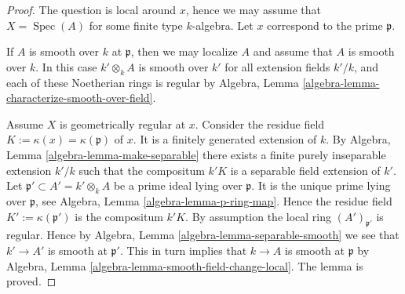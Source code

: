 \documentclass[10pt,a4paper]{amsart}
\theoremstyle{plain}
\theoremstyle{definition}
\theoremstyle{remark}
\numberwithin{equation}{subsection}
\def\Spec{\mathop{\mathrm{Spec}}}
\begin{document}
\begin{proof}
The question is local around $x$,
hence we may assume that $X = \Spec(A)$
for some finite type $k$-algebra.
Let $x$ correspond to the prime $\mathfrak p$.

\medskip\noindent
If $A$ is smooth over $k$ at $\mathfrak p$, then we may localize $A$
and assume that $A$ is smooth over $k$. In this case $k' \otimes_k A$
is smooth over $k'$ for all extension fields $k'/k$, and each of
these Noetherian rings is regular by
Algebra, Lemma \ref{algebra-lemma-characterize-smooth-over-field}.

\medskip\noindent
Assume $X$ is geometrically regular at $x$.
Consider the residue field $K := \kappa(x) = \kappa(\mathfrak p)$ of $x$.
It is a finitely generated extension of $k$.
By Algebra, Lemma \ref{algebra-lemma-make-separable}
there exists a finite purely inseparable
extension $k'/k$ such that the compositum
$k'K$ is a separable field extension of $k'$.
Let $\mathfrak p' \subset A' = k' \otimes_k A$ be a prime ideal
lying over $\mathfrak p$. It is the unique prime lying over $\mathfrak p$, see
Algebra, Lemma \ref{algebra-lemma-p-ring-map}.
Hence the residue field $K' := \kappa(\mathfrak p')$
is the compositum $k'K$. By assumption the local ring
$(A')_{\mathfrak p'}$ is regular. Hence by
Algebra, Lemma \ref{algebra-lemma-separable-smooth}
we see that $k' \to A'$ is smooth at $\mathfrak p'$.
This in turn implies that $k \to A$ is smooth at $\mathfrak p$ by
Algebra, Lemma \ref{algebra-lemma-smooth-field-change-local}.
The lemma is proved.
\end{proof}
\end{document}
